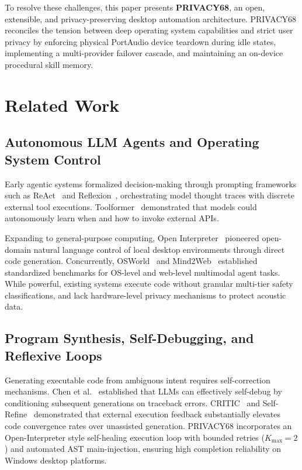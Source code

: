 \documentclass[conference]{IEEEtran}
\begin{document}
To resolve these challenges, this paper presents \textbf{PRIVACY68}, an open, extensible, and privacy-preserving desktop automation architecture. PRIVACY68 reconciles the tension between deep operating system capabilities and strict user privacy by enforcing physical PortAudio device teardown during idle states, implementing a multi-provider failover cascade, and maintaining an on-device procedural skill memory.

\section{Related Work}
\label{sec:related}
\subsection{Autonomous LLM Agents and Operating System Control}
Early agentic systems formalized decision-making through prompting frameworks such as ReAct~\cite{yao2023react} and Reflexion~\cite{shinn2023reflexion}, orchestrating model thought traces with discrete external tool executions. Toolformer~\cite{schick2023toolformer} demonstrated that models could autonomously learn when and how to invoke external APIs. 

Expanding to general-purpose computing, Open Interpreter~\cite{openinterpreter2024} pioneered open-domain natural language control of local desktop environments through direct code generation. Concurrently, OSWorld~\cite{li2024osworld} and Mind2Web~\cite{deng2024mind2web} established standardized benchmarks for OS-level and web-level multimodal agent tasks. While powerful, existing systems execute code without granular multi-tier safety classifications, and lack hardware-level privacy mechanisms to protect acoustic data.

\subsection{Program Synthesis, Self-Debugging, and Reflexive Loops}
Generating executable code from ambiguous intent requires self-correction mechanisms. Chen et al.~\cite{chen2024teaching} established that LLMs can effectively self-debug by conditioning subsequent generations on traceback errors. CRITIC~\cite{gou2024critic} and Self-Refine~\cite{madaan2023selfrefine} demonstrated that external execution feedback substantially elevates code convergence rates over unassisted generation. PRIVACY68 incorporates an Open-Interpreter style self-healing execution loop with bounded retries ($K_{\max}=2$) and automated AST main-injection, ensuring high completion reliability on Windows desktop platforms.
\end{document}

